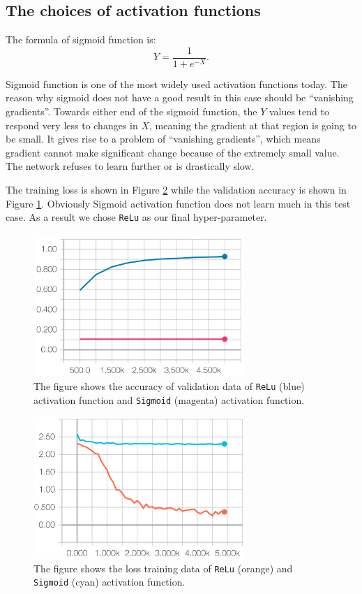 \documentclass[11pt]{article}
\begin{document}
\clearpage

\subsection{The choices of activation functions}
The formula of sigmoid function is:
$$Y = \frac{1}{1+e^{-X}}.$$

Sigmoid function is one of the most widely used activation functions today. The reason why sigmoid does not have a good result in this case should be ``vanishing gradients''. Towards either end of the sigmoid function, the $Y$ values tend to respond very less to changes in $X$, meaning the gradient at that region is going to be small. It gives rise to a problem of ``vanishing gradients'', which means gradient cannot make significant change because of the extremely small value. The network refuses to learn further or is drastically slow.

The training loss is shown in Figure \ref{fig:af_loss} while the validation accuracy is shown in Figure \ref{fig:af_accuracy}. Obviously Sigmoid activation function does not learn much in this test case. As a result we chose {\tt ReLu} as our final hyper-parameter.


\begin{figure}[!htb]
   \centering
   \includegraphics[width=8cm]{images/af_accuracy.png} %
   \caption{The figure shows the accuracy of validation data of {\tt ReLu} (blue) activation function and {\tt Sigmoid} (magenta) activation function. }
   \label{fig:af_accuracy}
\end{figure}



\begin{figure}[!htb]
   \centering
   \includegraphics[width=8cm]{images/af_loss.png} %
   \caption{The figure shows the loss training data of {\tt ReLu} (orange) and {\tt Sigmoid} (cyan) activation function. }
   \label{fig:af_loss}
\end{figure}
\end{document}
